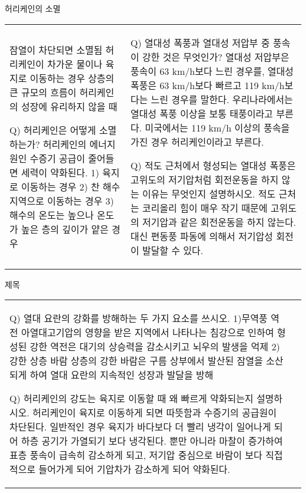 \begin{frame}[t]{허리케인의 소멸}
	\begin{tabular}{ll}
		\begin{minipage}[t]{0.45\textwidth}\scriptsize
			잠열이 차단되면 소멸됨
			허리케인이 차가운 물이나 육지로 이동하는 경우
			상층의 큰 규모의 흐름이 허리케인의 성장에 유리하지 않을 때
			
			Q) 허리케인은 어떻게 소멸하는가?
			허리케인의 에너지원인 수증기 공급이 줄어들면 세력이 약화된다.
			1) 육지로 이동하는 경우
			2) 찬 해수 지역으로 이동하는 경우
			3) 해수의 온도는 높으나 온도가 높은 층의 깊이가 얕은 경우
			
		\end{minipage}	
		&
		\begin{minipage}[t]{0.5\textwidth} \scriptsize	
			Q) 열대성 폭풍과 열대성 저압부 중 풍속이 강한 것은 무엇인가?
			열대성 저압부은 풍속이 63 km/h보다 느린 경우를, 열대성 폭풍은 63 km/h보다 빠르고 119 km/h보다는 느린 경우를 말한다. 우리나라에서는 열대성 폭풍 이상을 보통 태풍이라고 부른다. 미국에서는 119 km/h 이상의 풍속을 가진 경우 허리케인이라고 부른다.
			
			Q) 적도 근처에서 형성되는 열대성 폭풍은 고위도의 저기압처럼 회전운동을 하지 않는 이유는 무엇인지 설명하시오.
			적도 근처는 코리올리 힘이 매우 작기 때문에 고위도의 저기압과 같은 회전운동을 하지 않는다. 대신 편동풍 파동에 의해서 저기압성 회전이 발달할 수 있다. 
			
			
			
		\end{minipage}
	\end{tabular}
\end{frame}




\begin{frame}[t]{제목}
	\begin{tabular}{ll}
		\begin{minipage}[t]{0.45\textwidth}\scriptsize
			Q) 열대 요란의 강화를 방해하는 두 가지 요소를 쓰시오.
			1)무역풍 역전
			아열대고기압의 영향을 받은 지역에서 나타나는 침강으로 인하여 형성된 강한 역전은 대기의 상승력을 감소시키고 뇌우의 발생을 억제
			2) 강한 상층 바람
			상층의 강한 바람은 구름 상부에서 발산된 잠열을 소산되게 하여 열대 요란의 지속적인 성장과 발달을 방해
			
			Q) 허리케인의 강도는 육지로 이동할 때 왜 빠르게 약화되는지 설명하시오.
			허리케인이 육지로 이동하게 되면 따뜻함과 수증기의 공급원이 차단된다. 일반적인 경우 육지가 바다보다 더 빨리 냉각이 일어나게 되어 하층 공기가 가열되기 보다 냉각된다. 뿐만 아니라 마찰이 증가하여 표층 풍속이 급속히 감소하게 되고, 저기압 중심으로 바람이 보다 직접적으로 들어가게 되어 기압차가 감소하게 되어 약화된다.
			
			
			
			
		\end{minipage}	
		&
		\begin{minipage}[t]{0.5\textwidth} \scriptsize	
			
			
		\end{minipage}
	\end{tabular}
\end{frame}




